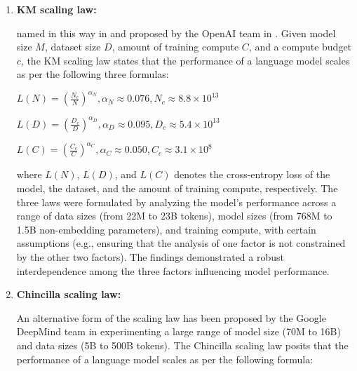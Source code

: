 \begin{enumerate}
	\item \textbf{KM scaling law:} {named in this way in \textcite{survey} and proposed by the OpenAI team in \textcite{kaplan2020scaling}. Given model size $M$, dataset size $D$, amount of training compute $C$, and a compute budget $c$, the KM scaling law states that the performance of a language model scales as per the following three formulas:

		      \begin{center}
			      \begin{math}
				      L(N)=(\frac{N_c}{N})^{\alpha_N}, \alpha_N \approx 0.076, N_c \approx 8.8 \times 10^{13}
			      \end{math}
		      \end{center}

		      \begin{center}
			      \begin{math}
				      L(D)=(\frac{D_c}{D})^{\alpha_D}, \alpha_D \approx 0.095, D_c \approx 5.4 \times 10^{13}
			      \end{math}
		      \end{center}

		      \begin{center}
			      \begin{math}
				      L(C)=(\frac{C_c}{C})^{\alpha_C}, \alpha_C \approx 0.050, C_c \approx 3.1 \times 10^8
			      \end{math}
		      \end{center}

		      where $L(N)$, $L(D)$, and $L(C)$ denotes the cross-entropy loss of the model, the dataset, and the amount of training compute, respectively.
		      The three laws were formulated by analyzing the model's performance across a range of data sizes (from 22M to 23B tokens), model sizes (from 768M to 1.5B non-embedding parameters), and training compute, with certain assumptions (e.g., ensuring that the analysis of one factor is not constrained by the other two factors).
		      The findings demonstrated a robust interdependence among the three factors influencing model performance.
	      }
	\item \textbf{Chincilla scaling law:} {An alternative form of the scaling law has been proposed by the Google DeepMind team in \textcite{hoffmann2022training} experimenting a large range of model size (70M to 16B) and data sizes (5B to 500B tokens).
		      The Chincilla scaling law posits that the performance of a language model scales as per the following formula:

}
\end{enumerate}
